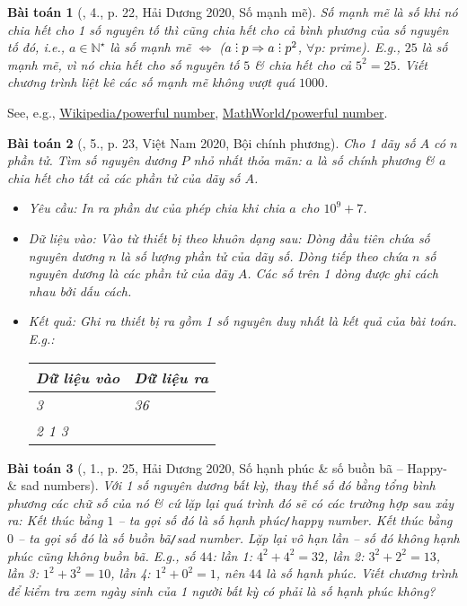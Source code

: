 \documentclass{article}
\newtheorem{baitoan}{Bài toán}
\DeclareRobustCommand{\divby}{%
	\mathrel{\vbox{\baselineskip.65ex\lineskiplimit0pt\hbox{.}\hbox{.}\hbox{.}}}%
}
\begin{document}
\begin{baitoan}[\cite{VietSTEM2021}, 4., p. 22, Hải Dương 2020, Số mạnh mẽ]
	\emph{Số mạnh mẽ} là số khi nó chia hết cho 1 số nguyên tố thì cũng chia hết cho cả bình phương của số nguyên tố đó, i.e., $a\in\mathbb{N}^\star$ là số mạnh mẽ $\Leftrightarrow$ ($a\divby p\Rightarrow a\divby p^2$, $\forall p$: prime). E.g., $25$ là số mạnh mẽ, vì nó chia hết cho số nguyên tố $5$ \& chia hết cho cả $5^2 = 25$. Viết chương trình liệt kê các số mạnh mẽ không vượt quá $1000$.
\end{baitoan}
See, e.g., \href{https://en.wikipedia.org/wiki/Powerful_number}{Wikipedia\texttt{/}powerful number}, \href{https://mathworld.wolfram.com/PowerfulNumber.html}{MathWorld\texttt{/}powerful number}.

\begin{baitoan}[\cite{VietSTEM2021}, 5., p. 23, Việt Nam 2020, Bội chính phương]
	Cho 1 dãy số $A$ có $n$ phần tử. Tìm số nguyên dương $P$ nhỏ nhất thỏa mãn: $a$ là số chính phương \& $a$ chia hết cho tất cả các phần tử của dãy số $A$.
	\begin{itemize}
		\item {\sf Yêu cầu:} In ra phần dư của phép chia khi chia $a$ cho $10^9 + 7$.
		\item {\sf Dữ liệu vào:} Vào từ thiết bị theo khuôn dạng sau: Dòng đầu tiên chứa số nguyên dương $n$ là số lượng phần tử của dãy số. Dòng tiếp theo chứa $n$ số nguyên dương là các phần tử của dãy $A$. Các số trên 1 dòng được ghi cách nhau bởi dấu cách.
		\item {\sf Kết quả:} Ghi ra thiết bị ra gồm 1 số nguyên duy nhất là kết quả của bài toán. E.g.:
		\begin{table}[H]
			\centering
			\begin{tabular}{|l|l|}
				\hline
				Dữ liệu vào & Dữ liệu ra \\
				\hline
				3 & 36 \\
				2 1 3 &  \\
				\hline
			\end{tabular}
		\end{table}
	\end{itemize}
\end{baitoan}

\begin{baitoan}[\cite{VietSTEM2021}, 1., p. 25, Hải Dương 2020, Số hạnh phúc \& số buồn bã -- Happy- \& sad numbers]
	Với 1 số nguyên dương bất kỳ, thay thế số đó bằng tổng bình phương các chữ số của nó \& cứ lặp lại quá trình đó sẽ có các trường hợp sau xảy ra: Kết thúc bằng $1$ -- ta gọi số đó là \emph{số hạnh phúc\texttt{/}happy number}. Kết thúc bằng $0$ -- ta gọi số đó là \emph{số buồn bã\texttt{/}sad number}. Lặp lại vô hạn lần -- số đó không hạnh phúc cũng không buồn bã. E.g., số $44$: lần 1: $4^2 + 4^2 = 32$, lần 2: $3^2 + 2^2 = 13$, lần 3: $1^2 + 3^2 = 10$, lần 4: $1^2 + 0^2 = 1$, nên $44$ là số hạnh phúc. Viết chương trình để kiểm tra xem ngày sinh của 1 người bất kỳ có phải là số hạnh phúc không?
\end{baitoan}
\end{document}
